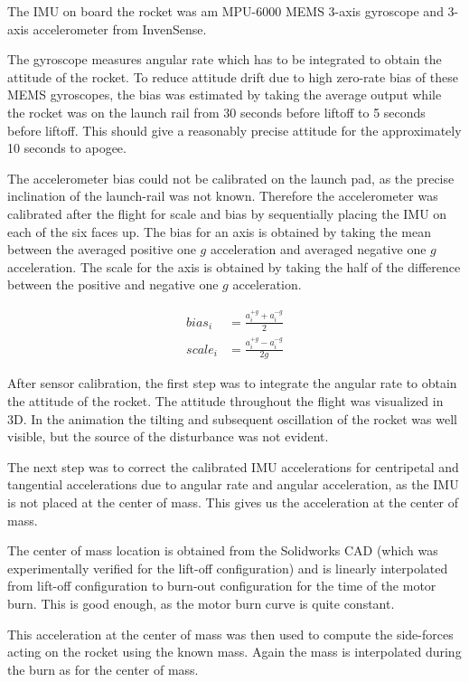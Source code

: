 The IMU on board the rocket was am MPU-6000 MEMS 3-axis gyroscope and 3-axis accelerometer from InvenSense.

The gyroscope measures angular rate which has to be integrated to obtain the attitude of the rocket.
To reduce attitude drift due to high zero-rate bias of these MEMS gyroscopes, the bias was estimated by taking the average output while the rocket was on the launch rail from 30 seconds before liftoff to 5 seconds before liftoff.
This should give a reasonably precise attitude for the approximately 10 seconds to apogee.

The accelerometer bias could not be calibrated on the launch pad, as the precise inclination of the launch-rail was not known.
Therefore the accelerometer was calibrated after the flight for scale and bias by sequentially placing the IMU on each of the six faces up.
The bias for an axis is obtained by taking the mean between the averaged positive one $g$ acceleration and averaged negative one $g$ acceleration.
The scale for the axis is obtained by taking the half of the difference between the positive and negative one $g$ acceleration.

\begin{equation}
\begin{align}
    bias_i &= \frac{a^{+g}_i + a^{-g}_i}{2} \\
    scale_i &= \frac{a^{+g}_i - a^{-g}_i}{2g}
\end{align}
\end{equation}


After sensor calibration, the first step was to integrate the angular rate to obtain the attitude of the rocket.
The attitude throughout the flight was visualized in 3D.
In the animation the tilting and subsequent oscillation of the rocket was well visible, but the source of the disturbance was not evident.


The next step was to correct the calibrated IMU accelerations for centripetal and tangential accelerations due to angular rate and angular acceleration, as the IMU is not placed at the center of mass. This gives us the acceleration at the center of mass.

The center of mass location is obtained from the Solidworks CAD (which was experimentally verified for the lift-off configuration) and is linearly interpolated from lift-off configuration to burn-out configuration for the time of the motor burn. This is good enough, as the motor burn curve is quite constant.

This acceleration at the center of mass was then used to compute the side-forces acting on the rocket using the known mass. Again the mass is interpolated during the burn as for the center of mass.

